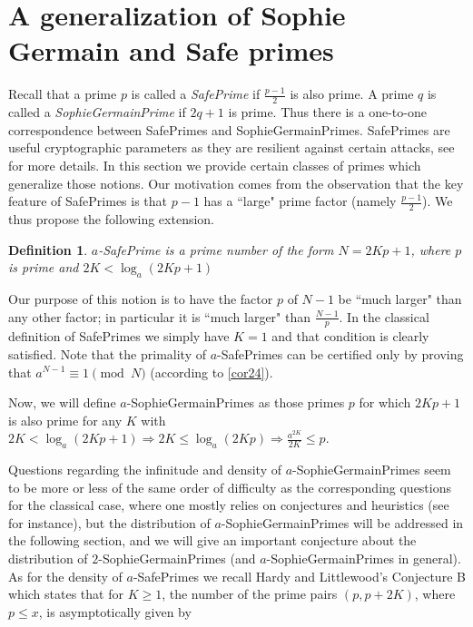 \documentclass{amsart}
\newtheorem{definition}[theorem]{Definition}
\numberwithin{equation}{section}
\begin{document}
\section{A generalization of Sophie Germain and Safe primes} 

Recall that a prime $p$ is called a \emph{SafePrime} if $\frac{p-1}{2}$ is also prime. A prime $q$ is called a \emph{SophieGermainPrime} if $2q+1$ is prime. Thus there is a one-to-one correspondence between SafePrimes and SophieGermainPrimes. SafePrimes are useful cryptographic parameters as they are resilient against certain attacks, see \cite{Crypto, Rib} for more details.
In this section we provide certain classes of primes which generalize those notions. Our motivation comes from the observation that the key feature of SafePrimes is that $p-1$ has a ``large" prime factor (namely $\frac{p-1}{2}$). We thus propose the following extension. 


\begin{definition}
	$a$-SafePrime is a prime number of the form $N=2Kp+1$, where $p$ is prime and $2K < \log_{a}(2Kp+1)$
\end{definition}

Our purpose of this notion is to have the factor $p$ of $N-1$ be ``much larger" than any other factor; in particular it is   ``much larger" than  $\frac{N-1}{p}$. In the classical definition of SafePrimes we simply have $K=1$ and that condition is clearly satisfied. Note that the primality of $a$-SafePrimes can be certified only by proving that  $a^{N-1} \equiv 1 \pmod N$ (according to \ref{cor24}).

Now, we will define $a$-SophieGermainPrimes as those primes $p$ for which $2Kp+1$ is also prime for any $K$ with $2K < \log_{a}(2Kp+1) \Longrightarrow 2K \leq \log_{a}(2Kp) \Longrightarrow \frac{a^{2K}}{2K} \leq p $. 

Questions regarding the infinitude and density of $a$-SophieGermainPrimes seem to be more or less of the same order of difficulty as the corresponding questions for the classical case, where one mostly relies on conjectures and heuristics  (see \cite{Chris, Korevaar} for instance), but the distribution of $a$-SophieGermainPrimes will be addressed in the following section, and we will give an important conjecture about the distribution of $2$-SophieGermainPrimes (and $a$-SophieGermainPrimes in general). As for the density of  $a$-SafePrimes we recall Hardy and Littlewood's Conjecture B \cite{HarLit} which states that for $K\geq 1$,  the number of the prime pairs $(p, p+2K)$, where $p \leq x$, is asymptotically given by
\end{document}
